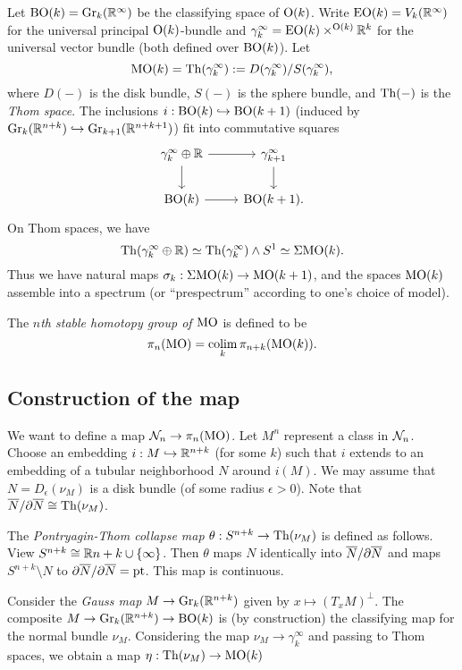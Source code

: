 \documentclass{article}
\begin{document}
Let $\mathrm{BO}(k) = \operatorname{Gr}_k(\mathbb{R}^\infty)$ be the classifying space of $\mathrm{O}(k)$.
Write $\mathrm{EO}(k) = V_k(\mathbb{R}^\infty)$ for the universal principal $\mathrm{O}(k)$-bundle and $\gamma_k^\infty = \mathrm{EO}(k) \times^{\mathrm{O}(k)} \mathbb{R}^k$ for the universal vector bundle (both defined over $\mathrm{BO}(k)$).
Let
\[
	\mathrm{MO}(k) = \operatorname{Th}(\gamma_k^\infty) := D(\gamma_k^\infty) / S(\gamma_k^\infty),
\]
where $D(-)$ is the disk bundle, $S(-)$ is the sphere bundle, and $\operatorname{Th}(-)$ is the \emph{Thom space}.
The inclusions $i: \mathrm{BO}(k) \hookrightarrow \mathrm{BO}(k+1)$ (induced by $\operatorname{Gr}_k(\mathbb{R}^{n+k}) \hookrightarrow \operatorname{Gr}_{k+1}(\mathbb{R}^{n+k+1})$) fit into commutative squares
\[
	\begin{tikzcd}
		\gamma_k^\infty \oplus \RR \rar \dar & \gamma_{k+1}^\infty \dar \\
		\BO(k) \rar & \BO(k+1).
	\end{tikzcd}
\]
On Thom spaces, we have
\[
	\operatorname{Th}(\gamma_k^\infty \oplus \mathbb{R}) \simeq \operatorname{Th}(\gamma_k^\infty) \wedge S^1 \simeq \Sigma \mathrm{MO}(k).
\]
Thus we have natural maps $\sigma_k: \Sigma \mathrm{MO}(k) \to \mathrm{MO}(k+1)$, and the spaces $\mathrm{MO}(k)$ assemble into a spectrum (or ``prespectrum'' according to one's choice of model).

\begin{dfn}
	The \emph{$n$th stable homotopy group of $\mathrm{MO}$} is defined to be
	\[
		\pi_n(\mathrm{MO}) = \operatorname*{colim}_k \pi_{n+k}(\mathrm{MO}(k)).
	\]
\end{dfn}

\subsection{Construction of the map}

We want to define a map $\mathcal{N}_n \to \pi_n(\mathrm{MO})$.
Let $M^n$ represent a class in $\mathcal{N}_n$.
Choose an embedding $i: M \hookrightarrow \mathbb{R}^{n+k}$ (for some $k$) such that $i$ extends to an embedding of a tubular neighborhood $N$ around $i(M)$.
We may assume that $N = D_\epsilon(\nu_M)$ is a disk bundle (of some radius $\epsilon > 0$).
Note that $\overline{N} / \partial \overline{N} \cong \operatorname{Th}(\nu_M)$.

The \emph{Pontryagin-Thom collapse map} $\theta: S^{n+k} \to \operatorname{Th}(\nu_M)$ is defined as follows.
View $S^{n+k} \cong \mathbb{R}{n+k} \cup \{\infty\}$.
Then $\theta$ maps $N$ identically into $\overline{N} / \partial \overline{N}$ and maps $S^{n+k} \setminus N$ to $\partial \overline{N} / \partial \overline{N} = \mathrm{pt}$.
This map is continuous.

Consider the \emph{Gauss map} $M \to \operatorname{Gr}_k(\mathbb{R}^{n+k})$ given by $x \mapsto (T_x M)^\perp$.
The composite $M \to \operatorname{Gr}_k(\mathbb{R}^{n+k}) \to \mathrm{BO}(k)$ is (by construction) the classifying map for the normal bundle $\nu_M$.
Considering the map $\nu_M \to \gamma_k^\infty$ and passing to Thom spaces, we obtain a map $\eta: \operatorname{Th}(\nu_M) \to \mathrm{MO}(k)$
\end{document}
